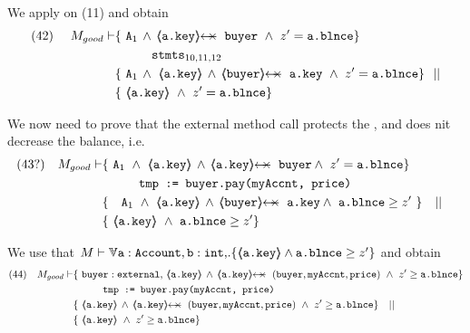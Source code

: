 \begin{proofO}
We apply  {}  on (11) and obtain 
\begin{align*}
\text{(42)}  \ \ \ \ M_{good} \vdash 
		&	\{  \ \Alocalsb\, \wedge\, \protectedFrom {\prg{a.key}} {\prg{buyer}}\ \wedge\ z'=\prg{a.\balance}  \} \\
		& \SPT \stmtsP\ \\  
		& \{ \ \Alocalsb\, \wedge \  {\inside{\prg{a.key}}} \, \wedge\, \protectedFrom{\prg{buyer}} {\prg{a.key}}  \ \wedge\ z'=\prg{a.\balance}  \} \ \ || \\
		& \{ \ {\inside{\prg{a.key}}}\  \wedge\ z'=\prg{a.\balance} \}
\end{align*}


 

We now need to prove that the external method call  protects the , and does nit decrease the balance, i.e.
\small
\begin{align*}
\text{(43?)} \ \ \ M_{good} \vdash & \{ \ \Alocalsb \   \wedge\    {\inside{\prg{a.key}}} \, \wedge\, \protectedFrom {\prg{a.key}} {\prg{buyer}} \wedge\ z'= \prg{a.\balance}  \} \\
		  		& \SPT  \prg{tmp := buyer.pay(myAccnt, price)}\ \\  
		  		& \{ \ \ \ \Alocalsb \ \wedge\ {\inside{\prg{a.key}}} \, \wedge\, \protectedFrom{\prg{buyer}} {\prg{a.key}} \wedge \ \prg{a.\balance}\geq z'\  \} \ \ \  || \ \ \  \\
		  		&   \{ \   {\inside{\prg{a.key}}}\ \wedge \  \prg{a.\balance}\geq z'  \}
\end{align*}
\normalsize

We use that $M \vdash \TwoStatesN  {\prg{a}:\prg{Account},\prg{b}:\prg{int}, }  {\inside{\prg{a.key}} \wedge \prg{a.\balance}\geq z'}   $
 and  obtain
 \\
 \small
\begin{align*}
\text{(44)} \ \ \ M_{good} \vdash & \{ \ \prg{buyer}:\prg{external},\,  {\inside{\prg{a.key}}} \, \wedge\, 
\protectedFrom {\prg{a.key}} {(\prg{buyer},\prg{myAccnt},\prg{price})} \  \wedge\ z'\geq \prg{a.\balance}  \} \\
		  		& \SPT  \prg{tmp := buyer.pay(myAccnt, price)}\ \\  
		  		& \{ \ \inside{\prg{a.key}} \, \wedge\, 
\protectedFrom {\prg{a.key}} {(\prg{buyer},\prg{myAccnt},\prg{price})}\ \wedge\ z'\geq \prg{a.\balance}  \} \ \ \  || \ \ \  \\
		  		&   \{ \   {\inside{\prg{a.key}}}\  \wedge\ z'\geq \prg{a.\balance}  \}
\end{align*}
\normalsize 
 

\end{proofO}
